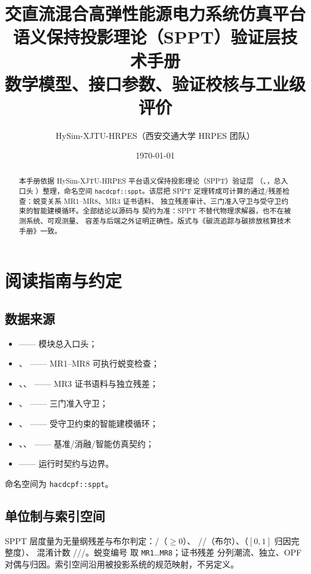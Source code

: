 \documentclass[UTF8,fontset=fandol,a4paper,11pt]{ctexart}
\title{\textbf{交直流混合高弹性能源电力系统仿真平台}\\[0.5em]
       {\Large 语义保持投影理论（SPPT）验证层技术手册}\\[0.3em]
       {\large 数学模型、接口参数、验证校核与工业级评价}}
\author{HySim-XJTU-HRPES（西安交通大学 HRPES 团队）}
\date{\today}
\begin{document}
\maketitle
\begin{abstract}
\noindent 本手册依据 HySim-XJTU-HRPES 平台语义保持投影理论（SPPT）验证层
（、，总入口头 ）整理，命名空间
\texttt{hacdcpf::sppt}。该层把 SPPT 定理转成可计算的通过/残差检查：蜕变关系 MR1–MR8、MR3 证书语料、
独立残差审计、三门准入守卫与受守卫约束的智能建模循环。全部结论以源码与
 契约为准：SPPT 不替代物理求解器，也不在被测系统、可观测量、
容差与后端之外证明正确性。版式与《碳流追踪与碳排放核算技术手册》一致。
\end{abstract}

\tableofcontents
\newpage

\section{阅读指南与约定}
\subsection{数据来源}
\begin{itemize}
  \item {} —— 模块总入口头；
  \item {}、 ——
        MR1–MR8 可执行蜕变检查；
  \item {}、、
         —— MR3 证书语料与独立残差；
  \item {}、 —— 三门准入守卫；
  \item {}、 ——
        受守卫约束的智能建模循环；
  \item {}、、 ——
        基准/消融/智能仿真契约；
  \item {} —— 运行时契约与边界。
\end{itemize}
命名空间为 \texttt{hacdcpf::sppt}。

\subsection{单位制与索引空间}
SPPT 层度量为无量纲残差与布尔判定：/（$\ge 0$）、
//（布尔）、（$[0,1]$ 归因完整度）、
混淆计数 ///。蜕变编号  取 \texttt{MR1}…\texttt{MR8}；证书残差
分列潮流、独立、OPF 对偶与归因。索引空间沿用被投影系统的规范映射，不另定义。
\end{document}
